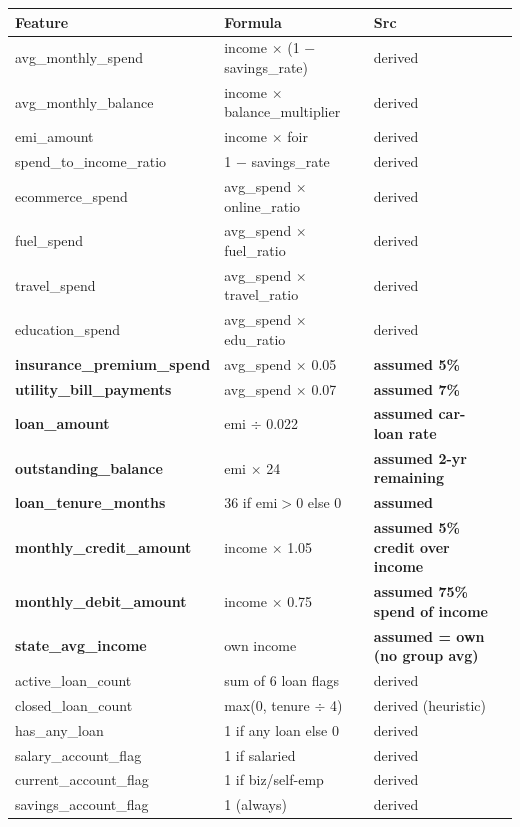 \documentclass[12pt,a4paper]{article}
\begin{document}
\begin{tabular}{llll}
\toprule
\textbf{Feature} & \textbf{Formula} & \textbf{Src} \\
\midrule
avg\_monthly\_spend & income $\times$ (1 $-$ savings\_rate) & derived \\
avg\_monthly\_balance & income $\times$ balance\_multiplier & derived \\
emi\_amount & income $\times$ foir & derived \\
spend\_to\_income\_ratio & 1 $-$ savings\_rate & derived \\
ecommerce\_spend & avg\_spend $\times$ online\_ratio & derived \\
fuel\_spend & avg\_spend $\times$ fuel\_ratio & derived \\
travel\_spend & avg\_spend $\times$ travel\_ratio & derived \\
education\_spend & avg\_spend $\times$ edu\_ratio & derived \\
\textbf{insurance\_premium\_spend} & avg\_spend $\times$ 0.05 & \textbf{assumed 5\%} \\
\textbf{utility\_bill\_payments} & avg\_spend $\times$ 0.07 & \textbf{assumed 7\%} \\
\textbf{loan\_amount} & emi $\div$ 0.022 & \textbf{assumed car-loan rate} \\
\textbf{outstanding\_balance} & emi $\times$ 24 & \textbf{assumed 2-yr remaining} \\
\textbf{loan\_tenure\_months} & 36 if emi$>$0 else 0 & \textbf{assumed} \\
\textbf{monthly\_credit\_amount} & income $\times$ 1.05 & \textbf{assumed 5\% credit over income} \\
\textbf{monthly\_debit\_amount} & income $\times$ 0.75 & \textbf{assumed 75\% spend of income} \\
\textbf{state\_avg\_income} & own income & \textbf{assumed = own (no group avg)} \\
active\_loan\_count & sum of 6 loan flags & derived \\
closed\_loan\_count & max(0, tenure $\div$ 4) & derived (heuristic) \\
has\_any\_loan & 1 if any loan else 0 & derived \\
salary\_account\_flag & 1 if salaried & derived \\
current\_account\_flag & 1 if biz/self-emp & derived \\
savings\_account\_flag & 1 (always) & derived \\
\bottomrule
\end{tabular}
\end{document}
